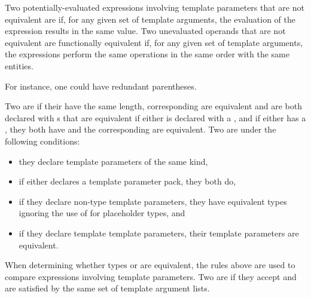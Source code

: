 %
Two potentially-evaluated expressions involving template parameters that are not equivalent are
if, for any given set of template arguments, the evaluation of the
expression results in the same value.
Two unevaluated operands that are not equivalent
are functionally equivalent if, for any given set of template arguments,
the expressions perform
the same operations in the same order with the same entities.
\begin{note}
For instance, one could have redundant parentheses.
\end{note}

\pnum
Two  are
 if
their  have the same length,
corresponding  are equivalent
and are both declared with s that are equivalent
if either 
is declared with a ,
and if either  has a ,
they both have
 and the corresponding
 are equivalent.
Two  are
under the following conditions:
\begin{itemize}
\item they declare template parameters of the same kind,
\item if either declares a template parameter pack, they both do,
\item if they declare non-type template parameters,
they have equivalent types
ignoring the use of  for placeholder types, and
\item if they declare template template parameters, their template
parameters are equivalent.
\end{itemize}
When determining whether types or 
are equivalent, the rules above are used to compare expressions
involving template parameters.
Two  are
if they accept and are satisfied by
the same set of template argument lists.


